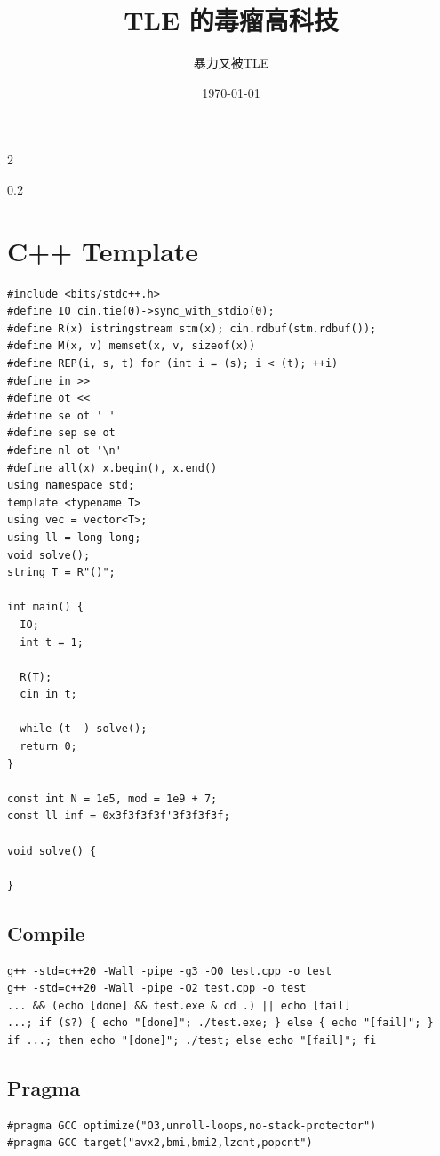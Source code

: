 \documentclass[10pt, a4paper, twocolumn]{article}
\title{TLE 的毒瘤高科技}
\author{暴力又被TLE}
\date{\today}
\begin{document}
\begin{multicols}{2}
  \begin{spacing}{0.2}
    \tableofcontents
  \end{spacing}
\end{multicols}

\newpage
	
\section{C++ Template}

\begin{verbatim}
#include <bits/stdc++.h>
#define IO cin.tie(0)->sync_with_stdio(0);
#define R(x) istringstream stm(x); cin.rdbuf(stm.rdbuf());
#define M(x, v) memset(x, v, sizeof(x))
#define REP(i, s, t) for (int i = (s); i < (t); ++i)
#define in >> 
#define ot << 
#define se ot ' '
#define sep se ot 
#define nl ot '\n'
#define all(x) x.begin(), x.end()
using namespace std;
template <typename T>
using vec = vector<T>;
using ll = long long;
void solve();
string T = R"()";

int main() {
  IO;
  int t = 1;

  R(T);
  cin in t;

  while (t--) solve();
  return 0;
}

const int N = 1e5, mod = 1e9 + 7;
const ll inf = 0x3f3f3f3f'3f3f3f3f;

void solve() {
  
}
\end{verbatim}

\subsection*{Compile}

\begin{verbatim}
g++ -std=c++20 -Wall -pipe -g3 -O0 test.cpp -o test
g++ -std=c++20 -Wall -pipe -O2 test.cpp -o test
... && (echo [done] && test.exe & cd .) || echo [fail]
...; if ($?) { echo "[done]"; ./test.exe; } else { echo "[fail]"; }
if ...; then echo "[done]"; ./test; else echo "[fail]"; fi
\end{verbatim}

\subsection*{Pragma}

\begin{verbatim}
#pragma GCC optimize("O3,unroll-loops,no-stack-protector")
#pragma GCC target("avx2,bmi,bmi2,lzcnt,popcnt")
\end{verbatim}
\end{document}
